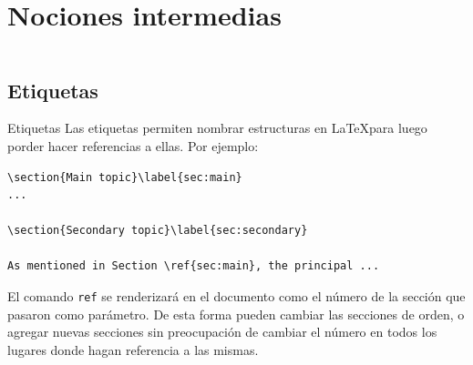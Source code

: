 \section{Nociones intermedias}
\begin{frame}
    \begin{columns}[t]
        \begin{column}{.5\textwidth}
          \tableofcontents[sections={1-2},currentsection]
        \end{column}
        \begin{column}{.5\textwidth}
          \tableofcontents[sections={3-4},currentsection]
        \end{column}
    \end{columns}
\end{frame}

\subsection{Etiquetas}
\begin{frame}[fragile]{Etiquetas}
Las etiquetas permiten nombrar estructuras en \LaTeX para luego porder hacer
referencias a ellas. Por ejemplo:

\begin{lstlisting}[basicstyle=\tiny]
\section{Main topic}\label{sec:main}
...

\section{Secondary topic}\label{sec:secondary}

As mentioned in Section \ref{sec:main}, the principal ...
\end{lstlisting}

El comando \texttt{ref} se renderizará en el documento como el número de la
sección que pasaron como parámetro. De esta forma pueden cambiar las secciones
de orden, o agregar nuevas secciones sin preocupación de cambiar el número en
todos los lugares donde hagan referencia a las mismas.

\end{frame}

